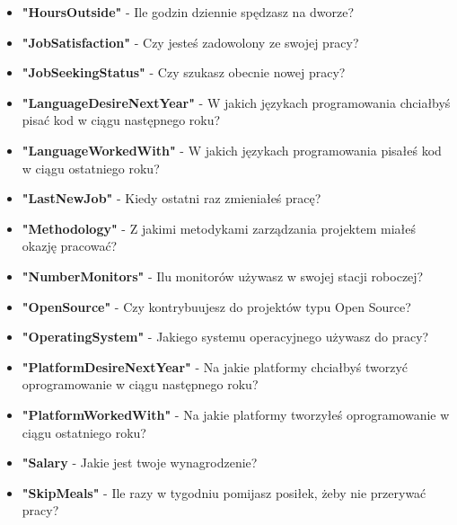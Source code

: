 \begin{appendices}
\begin{itemize}
        \item \textbf{"HoursOutside"} - Ile godzin dziennie spędzasz na dworze?
        \item \textbf{"JobSatisfaction"} - Czy jesteś zadowolony ze swojej pracy?
        \item \textbf{"JobSeekingStatus"} - Czy szukasz obecnie nowej pracy?
        \item \textbf{"LanguageDesireNextYear"} - W jakich językach programowania chciałbyś pisać kod w ciągu następnego roku?
        \item \textbf{"LanguageWorkedWith"} - W jakich językach programowania pisałeś kod w ciągu ostatniego roku?
        \item \textbf{"LastNewJob"} - Kiedy ostatni raz zmieniałeś pracę?
        \item \textbf{"Methodology"} - Z jakimi metodykami zarządzania projektem miałeś okazję pracować?
        \item \textbf{"NumberMonitors"} - Ilu monitorów używasz w swojej stacji roboczej?
        \item \textbf{"OpenSource"} - Czy kontrybuujesz do projektów typu Open Source?
        \item \textbf{"OperatingSystem"} - Jakiego systemu operacyjnego używasz do pracy?
        \item \textbf{"PlatformDesireNextYear"} - Na jakie platformy chciałbyś tworzyć oprogramowanie w ciągu następnego roku?
        \item \textbf{"PlatformWorkedWith"} - Na jakie platformy tworzyłeś oprogramowanie w ciągu ostatniego roku?
        \item \textbf{"Salary} - Jakie jest twoje wynagrodzenie?
        \item \textbf{"SkipMeals"} - Ile razy w tygodniu pomijasz posiłek, żeby nie przerywać pracy?

\end{itemize}
\end{appendices}
